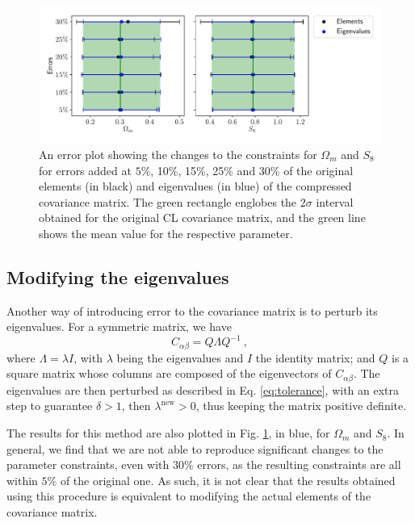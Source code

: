 \documentclass[twocolumn]{\docclass}
\newcommand{\rf}[1]{\ref{fig:#1}}
\newcommand\be{\begin{equation}}
\newcommand\ee{\end{equation}}
\begin{document}
	\begin{figure}
		\includegraphics[width=\columnwidth]{Tolerance_errors.pdf}
		\caption{An error plot showing the changes to the constraints for $\Omega_m$ and $S_8$ for errors added at $5\%$, 10\%, 15\%, 25\% and 30\% of the original elements (in black) and eigenvalues (in blue) of the compressed covariance matrix. The green rectangle englobes the $2 \sigma$ interval obtained for the original CL covariance matrix, and the green line shows the mean value for the respective parameter. } \label{fig:tolerance}
	\end{figure}
	
	\subsection{Modifying the eigenvalues}
	
	Another way of introducing error to the covariance matrix is to perturb its eigenvalues. For a symmetric matrix, we have
	\be
	C_{\alpha \beta} = Q\Lambda Q^{-1}\ ,
	\ee
	where $\Lambda = \lambda I$, with $\lambda$ being the eigenvalues and $I$ the identity matrix; and $Q$ is a square matrix whose columns are composed of the eigenvectors of $C_{\alpha \beta}$. The eigenvalues are then perturbed as described in Eq. \ref{eq:tolerance}, with an extra step to guarantee $\delta > 1$, then $\lambda^{\mathrm{new}} > 0$, thus keeping the matrix positive definite.
	
	The results for this method are also plotted in Fig. \rf{tolerance}, in blue, for $\Omega_m$ and $S_8$. In general, we find that we are not able to reproduce significant changes to the parameter constraints, even with $30\%$ errors, as the resulting constraints are all within $5\%$ of the original one. As such, it is not clear that the results obtained using this procedure is equivalent to modifying the actual elements of the covariance matrix. 
	
	
\end{document}
